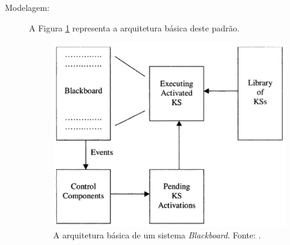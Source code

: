 \begin{description}


    \item[Modelagem:]  A Figura \ref{fig:blackboard_model} representa a arquitetura básica deste padrão.
    
\begin{figure}[h!]
    \centering
    \includegraphics[scale=0.5]{figuras/blackboard/blackboard_model.png}
    \caption{A arquitetura básica de um sistema \textit{Blackboard}. Fonte: .}
    \label{fig:blackboard_model}
\end{figure}


\end{description}
